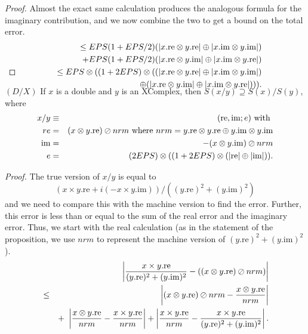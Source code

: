 \begin{proof}{}
Almost the exact same calculation produces the analogous formula for the imaginary contribution, and we now combine the
two to get a bound on the total error.  
\begin{eqnarray*}
&&\le EPS (1 + EPS/2) (|x.\mathrm {re} \otimes y.\mathrm {re}| \oplus |x.\mathrm {im} \otimes y.\mathrm {im}|) \\
&&\quad +
EPS (1 + EPS/2) (|x.\mathrm {re} \otimes y.\mathrm {im}| \oplus |x.\mathrm {im} \otimes y.\mathrm {re}| )\\
&&\le EPS \otimes ((1 +
2EPS)\otimes((|x.\mathrm {re} \otimes y.\mathrm {re}| \oplus |x.\mathrm {im} \otimes y.\mathrm {im}| ) \\
&&\quad \oplus
(|x.\mathrm {re} \otimes y.\mathrm {im}| \oplus |x.\mathrm {im} \otimes y.\mathrm {re}| ))).
\\
\noalign{\vskip-36pt}
\end{eqnarray*}
\end{proof}

\begin{proposition}\label{GMT prop7.11}{$(D / X)$}
If $x$ is a double and $y$ is an {\textrm XComplex,} then
$S(x / y) \supseteq S(x) / S(y)${\textrm ,} where
\begin{eqnarray*}
x  / y & \equiv& (\mathrm {re},\mathrm {im};e)\hbox{ with }\\
re& =& (x  \otimes y.\mathrm {re})\oslash nrm \hbox{ where $nrm = y.\mathrm {re} \otimes y.\mathrm {re} \oplus y.\mathrm {im} \otimes
y.\mathrm {im}$}
\\
\mathrm {im} &=& -(x  \otimes y.\mathrm {im}) \oslash nrm\\
e& =& (2EPS) \otimes ((1 +  2EPS)\otimes(|\mathrm {re}| \oplus |\mathrm {im}|)).
\end{eqnarray*}
\end{proposition}

\noindent\emph{Proof.}
The true version of $x/y$ is equal to  
$$(x \times y.\mathrm {re} + i (-x \times y.\mathrm {im}))/ ((y.\mathrm {re})^2 + (y.\mathrm {im})^2)$$ and we need to compare this with the
machine version to find the error.  Further, this error is less than or equal to the sum of the real error and the imaginary
error. Thus, we start with the real calculation (as in the statement of the proposition, we use $nrm$ to represent the
machine version of $(y.\mathrm {re})^2 + (y.\mathrm {im})^2$).
\begin{eqnarray*}
&&\hskip-36pt \left|{x \times y.\mathrm {re}  \over (y.\mathrm {re})^2 + (y.\mathrm {im})^2} - ((x \otimes y.\mathrm {re})\oslash
nrm)\right|\\
&
\le &\left|(x
\otimes y.\mathrm {re}) \oslash nrm - {x \otimes y.\mathrm {re} \over nrm}\right|\\
&& +\ \left|{x \otimes y.\mathrm {re} \over nrm} - {x
\times y.\mathrm {re}
\over nrm}\right| + \left|{x \times y.\mathrm {re} \over nrm} - 
{x \times y.\mathrm {re}  \over (y.\mathrm {re})^2 + (y.\mathrm {im})^2}\right|.
\end{eqnarray*}
 
